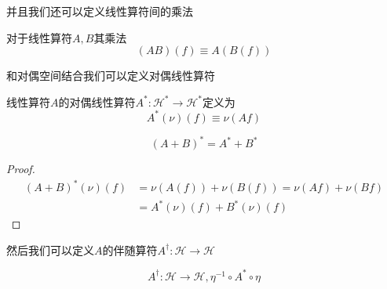 并且我们还可以定义线性算符间的乘法
\begin{definition}[线性算符的乘法]
    对于线性算符$A, B$其乘法
    \begin{equation}
        (AB)(f)\equiv A(B(f))
    \end{equation}
\end{definition}

和对偶空间结合我们可以定义对偶线性算符
\begin{definition}[对偶线性算符]
    线性算符$A$的对偶线性算符$A^*: \mathscr H^* \to \mathscr H^*$定义为
    \begin{equation}
        A^*(\nu)(f)\equiv\nu(Af)
    \end{equation}
\end{definition}
\begin{theorem}
    \begin{equation}
        (A+B)^*=A^*+B^*
    \end{equation}
\end{theorem}
\begin{proof}
    \begin{equation}
        \begin{aligned}
            (A+B)^*(\nu)(f)&=\nu(A(f))+\nu(B(f))=\nu(Af)+\nu(Bf)\\
            &=A^*(\nu)(f)+B^*(\nu)(f)
        \end{aligned}
    \end{equation}
\end{proof}

然后我们可以定义$A$的伴随算符$A^\dagger: \mathscr H\to\mathscr H$
\begin{definition}
    \begin{equation}
        A^\dagger: \mathscr H\to\mathscr H, \eta^{-1}\circ A^*\circ\eta
    \end{equation}
\end{definition}

